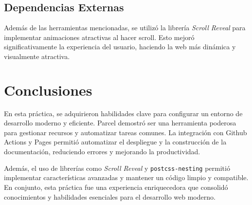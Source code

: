 \documentclass{article}
\begin{document}
\subsection{Dependencias Externas}\label{subsec:dependencias-externas}

Además de las herramientas mencionadas, se utilizó la librería \textit{Scroll Reveal} para implementar animaciones atractivas al hacer scroll. Esto mejoró significativamente la experiencia del usuario, haciendo la web más dinámica y visualmente atractiva.

\section{Conclusiones}\label{sec:conclusiones}

En esta práctica, se adquirieron habilidades clave para configurar un entorno de desarrollo moderno y eficiente. Parcel demostró ser una herramienta poderosa para gestionar recursos y automatizar tareas comunes. La integración con Github Actions y Pages permitió automatizar el despliegue y la construcción de la documentación, reduciendo errores y mejorando la productividad.

Además, el uso de librerías como \textit{Scroll Reveal} y \texttt{postcss-nesting} permitió implementar características avanzadas y mantener un código limpio y compatible. En conjunto, esta práctica fue una experiencia enriquecedora que consolidó conocimientos y habilidades esenciales para el desarrollo web moderno.
\end{document}
